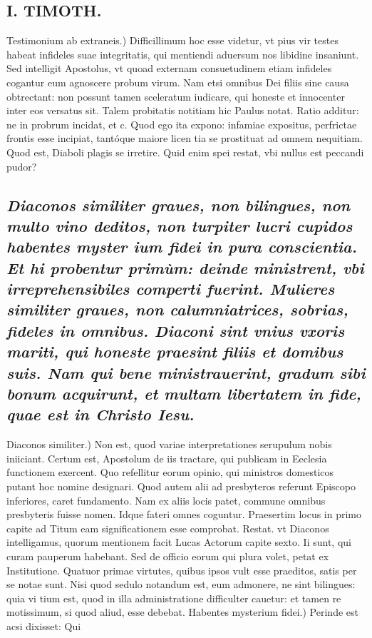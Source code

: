 \documentclass{article}
\begin{document}
\begin{pages}
\section*{I. TIMOTH. }
\marginpar{[ p.36 ]}\pstart Testimonium ab extraneis.) Difficillimum hoc esse videtur, vt pius vir testes habeat infideles suae integritatis, qui mentiendi aduersum nos libidine insaniunt. Sed intelligit Apostolus, vt quoad externam consuetudinem etiam infideles cogantur eum agnoscere probum virum. Nam etsi omnibus Dei filiis sine causa obtrectant: non possunt tamen sceleratum iudicare, qui honeste et innocenter inter eos versatus sit. Talem probitatis notitiam hic Paulus notat. Ratio additur: ne in probrum incidat, et c. Quod ego ita expono: infamiae expositus, perfrictae frontis esse incipiat, tantóque maiore licen tia se prostituat ad omnem nequitiam. Quod est, Diaboli plagis se irretire. Quid enim spei restat, vbi nullus est peccandi pudor?  \pend
{}
{}
\subsection*{\textit{Diaconos similiter graues, non bilingues, non multo vino deditos, non turpiter lucri cupidos habentes myster ium fidei in pura conscientia. Et hi probentur primùm: deinde ministrent, vbi irreprehensibiles comperti fuerint. Mulieres similiter graues, non calumniatrices, sobrias, fideles in omnibus. Diaconi sint vnius vxoris mariti, qui honeste praesint filiis et domibus suis. Nam qui bene ministrauerint, gradum sibi bonum acquirunt, et multam libertatem in fide, quae est in Christo Iesu. }}\pstart Diaconos similiter.) Non est, quod variae interpretationes serupulum nobis iniiciant. Certum est, Apostolum de iis tractare, qui publicam in Eeclesia functionem exercent. Quo refellitur eorum opinio, qui ministros domesticos putant hoc nomine designari. Quod autem alii ad presbyteros referunt Episcopo inferiores, caret fundamento. Nam ex aliis locis patet, commune omnibus presbyteris fuisse nomen. Idque fateri omnes coguntur. Praesertim locus in primo capite ad Titum eam significationem esse comprobat. Restat. vt Diaconos intelligamus, quorum mentionem facit Lucas Actorum capite sexto. Ii sunt, qui curam pauperum habebant. Sed de officio eorum qui plura volet, petat ex Institutione. Quatuor primae virtutes, quibus ipsos vult esse praeditos, satis per se notae sunt. Nisi quod sedulo notandum est, eum admonere, ne sint bilingues: quia vi tium est, quod in illa administratione difficulter cauetur: et tamen re motissimum, si quod aliud, esse debebat.  \pend\pstart Habentes mysterium fidei.) Perinde est acsi dixisset: Qui  \pend

\end{pages}
\end{document}
